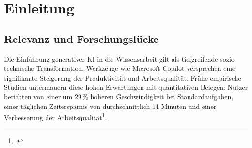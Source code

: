 \documentclass[12pt,a4paper,oneside]{article} %
\begin{document}
\newpage
\setcounter{page}{2} %
\thispagestyle{empty} %
\tableofcontents
\clearpage


\newpage
\listoffigures
{}
\clearpage

\newpage
\listoftables
{}
\clearpage

\newpage
{} %
\setcounter{page}{1} %

\section{Einleitung}

\subsection{Relevanz und Forschungslücke}
Die Einführung generativer KI in die Wissensarbeit gilt als tiefgreifende sozio-technische Transformation. Werkzeuge wie Microsoft Copilot versprechen eine signifikante Steigerung der Produktivität und Arbeitsqualität. Frühe empirische Studien untermauern diese hohen Erwartungen mit quantitativen Belegen: Nutzer berichten von einer um 29\,\% höheren Geschwindigkeit bei Standardaufgaben, einer täglichen Zeitersparnis von durchschnittlich 14 Minuten und einer Verbesserung der Arbeitsqualität\footcite{Microsoft2025Worklab}.
\end{document}
